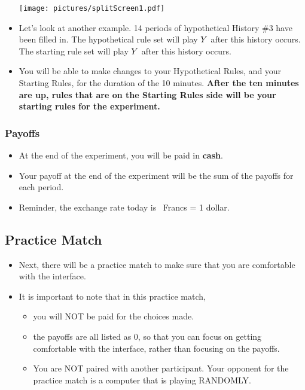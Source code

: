 \documentclass[11pt]{article}
\newcommand{\dblbkt}[1]{}
\begin{document}
\begin{itemize}
\texttt{[image: pictures/splitScreen1.pdf]} 

\item \dblbkt{1}Let's look at another example. \dblbkt{1}14 periods of hypothetical History \#3 have been filled in. \dblbkt{1}The hypothetical rule set will play $Y$ after this history occurs.  \dblbkt{1}The starting rule set will play $Y$ after this history occurs. \dblbkt{slnc 5000}

\item You will be able to make changes to your Hypothetical Rules, and your Starting Rules, for the duration of the 10 minutes. {\bf After the ten minutes are up, rules that are on the Starting Rules side will be your starting rules for the experiment.}
\end{itemize} 


\subsubsection*{\dblbkt{4}Payoffs} 

 \begin{itemize} 
\item \dblbkt{1}At the end of the experiment, you will be paid in {\bf cash}.   
\item \dblbkt{1}Your payoff at the end of the experiment will be the sum of the payoffs for each period.
\item \dblbkt{1}Reminder, the exchange rate today is \exchangeRate\ Francs = 1 dollar.
\end{itemize} 

\subsection*{\dblbkt{3}Practice Match}
\begin{itemize} 
\item Next, there will be a practice match to make sure that you are comfortable with the interface.
\item It is important to note that in this practice match, 
\begin{itemize} 
\item \dblbkt{1}you will NOT be paid for the choices made.
\item \dblbkt{1}the payoffs are all listed as 0, so that you can focus on getting comfortable with the interface, rather than focusing on the payoffs.
\item \dblbkt{1}You are NOT paired with another participant.  Your opponent for the practice match is a computer that is playing RANDOMLY.
\end{itemize}
\end{itemize} 

\end{document}
